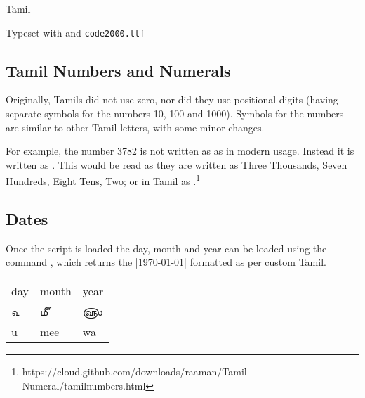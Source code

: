 \begin{scriptexample}[]{Tamil}

\hfill  Typeset with \cmd{\tamil} and \texttt{code2000.ttf}
\end{scriptexample}

\subsection{Tamil Numbers and Numerals}

Originally, Tamils did not use zero, nor did they use positional digits (having separate 
symbols for the numbers 10, 100 and 1000). Symbols for the numbers are similar to 
other Tamil letters, with some minor changes. 

For example, the number 3782 is not written as  as in modern usage. Instead it 
is written as . This would be read as they are written as 
Three Thousands, Seven Hundreds, Eight Tens, Two; or in Tamil as 
.\footnote{https://cloud.github.com/downloads/raaman/Tamil-Numeral/tamilnumbers.html}

\subsection{Dates}

Once the script is loaded the day, month and year can be loaded using the command  \cmd{\tamildate}, which returns the |\today| formatted as per custom Tamil. 

\begin{center}
\bgroup
\tamil
\begin{tabular}{lll}
day	 &month	&year	\\

௳	&௴	      &௵	\\

u	&mee	      &wa	\\
\end{tabular}
\egroup
\end{center}










